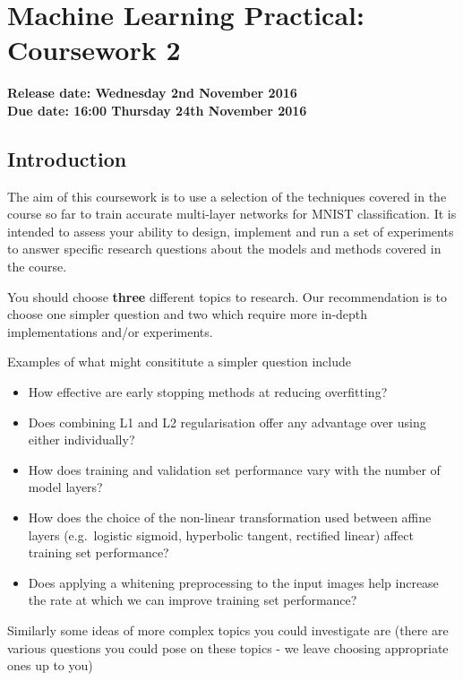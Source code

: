 \documentclass[11pt,]{article}
\author{}
\date{}
\begin{document}
\section{Machine Learning Practical: Coursework
2}\label{machine-learning-practical-coursework-2}

\textbf{Release date: Wednesday 2nd November 2016}\\\textbf{Due date:
16:00 Thursday 24th November 2016}

\subsection{Introduction}\label{introduction}

The aim of this coursework is to use a selection of the techniques
covered in the course so far to train accurate multi-layer networks for
MNIST classification. It is intended to assess your ability to design,
implement and run a set of experiments to answer specific research
questions about the models and methods covered in the course.

You should choose \textbf{three} different topics to research. Our
recommendation is to choose one simpler question and two which require
more in-depth implementations and/or experiments.

Examples of what might consititute a simpler question include

\begin{itemize}
\itemsep1pt\parskip0pt
\item
  How effective are early stopping methods at reducing overfitting?
\item
  Does combining L1 and L2 regularisation offer any advantage over using
  either individually?
\item
  How does training and validation set performance vary with the number
  of model layers?
\item
  How does the choice of the non-linear transformation used between
  affine layers (e.g.~logistic sigmoid, hyperbolic tangent, rectified
  linear) affect training set performance?
\item
  Does applying a whitening preprocessing to the input images help
  increase the rate at which we can improve training set performance?
\end{itemize}

Similarly some ideas of more complex topics you could investigate are
(there are various questions you could pose on these topics - we leave
choosing appropriate ones up to you)
\end{document}
